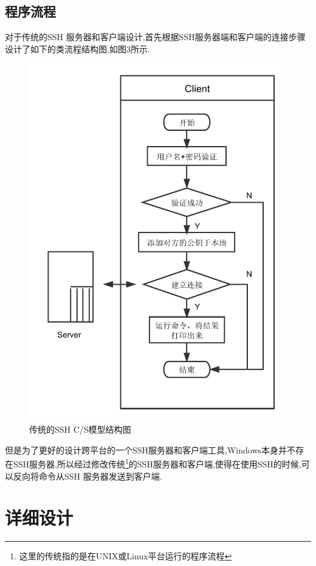 \documentclass[UTF8,a4paper,cs4size]{ctexart}
\begin{document}
\subsection{程序流程}
对于传统的SSH 服务器和客户端设计,首先根据SSH服务器端和客户端的连接步骤设计了如下的类流程结构图,如图3所示.
\begin{figure}[htbp]
\centering
\includegraphics[scale = 0.6]{flow.pdf}
\caption{传统的SSH C/S模型结构图}
\end{figure}
\newpage
但是为了更好的设计跨平台的一个SSH服务器和客户端工具,Windows本身并不存在SSH服务器,所以经过修改传统\footnote{这里的传统指的是在UNIX或Linux平台运行的程序流程}的SSH服务器和客户端,使得在使用SSH的时候,可以反向将命令从SSH 服务器发送到客户端.

\newpage
\newpage
\section{详细设计}
\end{document}
